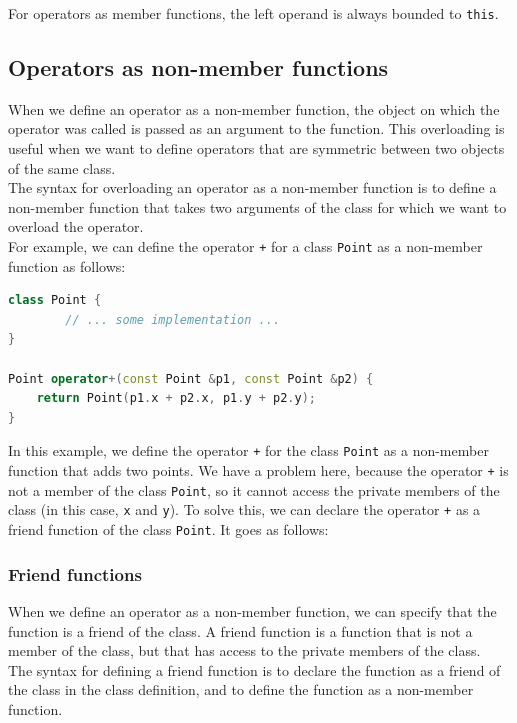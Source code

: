 For operators as member functions, the left operand is always bounded to \texttt{this}.

\subsection{Operators as non-member functions}

When we define an operator as a non-member function, the object on which the operator
was called is passed as an argument to the function. This overloading is useful when
we want to define operators that are symmetric between two objects of the same class.\\

The syntax for overloading an operator as a non-member function is to define a non-member
function that takes two arguments of the class for which we want to overload the operator.\\

For example, we can define the operator \texttt{+} for a class \texttt{Point} as a
non-member function as follows:\\

\begin{lstlisting}[language=C++]
class Point {
        // ... some implementation ...
}

Point operator+(const Point &p1, const Point &p2) {
    return Point(p1.x + p2.x, p1.y + p2.y);
}
\end{lstlisting}

In this example, we define the operator \texttt{+} for the class \texttt{Point} as a
non-member function that adds two points. We have a problem here, because the operator 
\texttt{+} is not a member of the class \texttt{Point}, so it cannot access the private 
members of the class (in this case, \texttt{x} and \texttt{y}). To solve this, we can 
declare the operator \texttt{+} as a friend function of the class \texttt{Point}. 
It goes as follows:

\subsubsection{Friend functions}

When we define an operator as a non-member function, we can specify that the function
is a friend of the class. A friend function is a function that is not a member of the
class, but that has access to the private members of the class.\\

The syntax for defining a friend function is to declare the function as a friend of
the class in the class definition, and to define the function as a non-member function.\\

